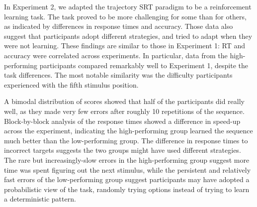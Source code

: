 \documentclass[man,floatsintext]{apa6}
\begin{document}


In Experiment 2, we adapted the trajectory SRT paradigm to be a reinforcement learning task. The task proved to be more challenging for some than for others, as indicated by differences in response times and accuracy. Those data also suggest that participants adopt different strategies, and tried to adapt when they were not learning. These findings are similar to those in Experiment 1: RT and accuracy were correlated across experiments. In particular, data from the high-performing participants compared remarkably well to Experiment 1, despite the task differences. The most notable similarity was the difficulty participants experienced with the fifth stimulus position. 

A bimodal distribution of scores showed that half of the participants did really well, as they made very few errors after roughly 10 repetitions of the sequence. Block-by-block analysis of the response times showed a difference in speed-up across the experiment, indicating the high-performing group learned the sequence much better than the low-performing group. The difference in response times to incorrect targets suggests the two groups might have used different strategies. The rare but increasingly-slow errors in the high-performing group suggest more time was spent figuring out the next stimulus, while the persistent and relatively fast errors of the low-performing group suggest participants may have adopted a probabilistic view of the task, randomly trying options instead of trying to learn a deterministic pattern.
\end{document}
